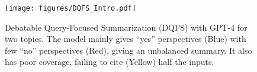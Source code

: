 \begin{figure}
    \centering
    \texttt{[image: figures/DQFS\_Intro.pdf]}
    \caption{\label{fig:intro} Debatable Query-Focused Summarization (DQFS) with GPT-4 for two topics. The model mainly gives ``yes'' perspectives (\colorbox{myblue1}{Blue}) with few ``no'' perspectives (\colorbox{myred1}{Red}), giving an unbalanced summary. It also has poor coverage, failing to cite (\colorbox{myyellow1}{Yellow}) half the inputs.}
\end{figure}